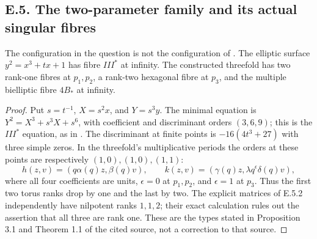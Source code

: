 \subsection{E.5. The two-parameter family and its actual singular fibres}
\begin{proposition}
The configuration in the question is not the configuration of
\cite{ViaTwo26push}.  The elliptic surface
$y^2=x^3+tx+1$ has fibre $III^*$ at infinity.  The constructed
threefold has two rank-one fibres at $p_1,p_2$, a rank-two
hexagonal fibre at $p_3$, and the multiple bielliptic fibre
$4B_*$ at infinity.
\end{proposition}
\begin{proof}
Put $s=t^{-1}$, $X=s^2x$, and $Y=s^3y$.  The minimal equation is
$Y^2=X^3+s^3X+s^6$, with coefficient and discriminant orders
$(3,6,9)$; this is the $III^*$ equation, as in
\cite[Lemma 2.1]{ViaTwo26push}.  The discriminant at finite
points is $-16(4t^3+27)$ with three simple zeros.  In the
threefold's multiplicative periods the orders at these points
are respectively $(1,0),(1,0),(1,1)$:
\[
 h(z,v)=(q\alpha(q)z,\beta(q)v),\qquad
 k(z,v)=(\gamma(q)z,\lambda q^\epsilon\delta(q)v),
\]
where all four coefficients are units, $\epsilon=0$ at $p_1,p_2$,
and $\epsilon=1$ at $p_3$.  Thus the first two torus ranks
drop by one and the last by two.  The explicit matrices of
E.5.2 independently have nilpotent ranks $1,1,2$; their exact
calculation rules out the assertion that all three are rank one.
These are the types stated in Proposition 3.1 and Theorem 1.1
of the cited source, not a correction to that source.
\end{proof}

